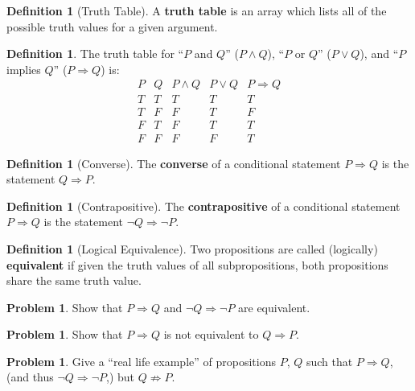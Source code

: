 \documentclass[letterpaper, twoside, 12pt]{book}
\theoremstyle{definition}
\theoremstyle{definition}
\newtheorem{definition}[theorem]{Definition}
\newtheorem{problem}[theorem]{Problem}
\begin{document}
\begin{definition}[Truth Table]
 A \textbf{truth table} is an array which lists all of the possible truth values for a given argument.
\end{definition}

\begin{definition}
 The truth table for ``$P$ and $Q$'' ($P \wedge Q$), ``$P$ or $Q$'' ($P \vee Q$), and ``$P$ implies $Q$'' ($P \Rightarrow Q$) is:
 $$\begin{array}{c|c|c|c|c}
    P & Q & P \wedge Q & P \vee Q & P \Rightarrow Q \\
    \hline
    T & T & T & T & T \\
    T & F & F & T & F \\
    F & T & F & T & T \\
    F & F & F & F & T
   \end{array}$$
\end{definition}

\begin{definition}[Converse]
 The \textbf{converse} of a conditional statement $P \Rightarrow Q$ is the statement $Q \Rightarrow P$.
\end{definition}

\begin{definition}[Contrapositive]
 The \textbf{contrapositive} of a conditional statement $P \Rightarrow Q$ is the statement $\neg Q \Rightarrow \neg P$.
\end{definition}

\begin{definition}[Logical Equivalence]
 Two propositions are called (logically) \textbf{equivalent} if given the
 truth values of all subpropositions, both propositions share the same
 truth value.
\end{definition}

\begin{problem}
 Show that $P \Rightarrow Q$ and $\neg Q \Rightarrow \neg P$ are equivalent.
\end{problem}

\vfill

\begin{problem}
 Show that $P \Rightarrow Q$ is not equivalent to $Q \Rightarrow P$.
\end{problem}

\vfill

\newpage

\begin{problem}
  Give a ``real life example'' of propositions $P$, $Q$ such that $P\Rightarrow Q$,
  (and thus $\neg Q\Rightarrow \neg P$,) but $Q\not\Rightarrow P$.
\end{problem}
\end{document}
